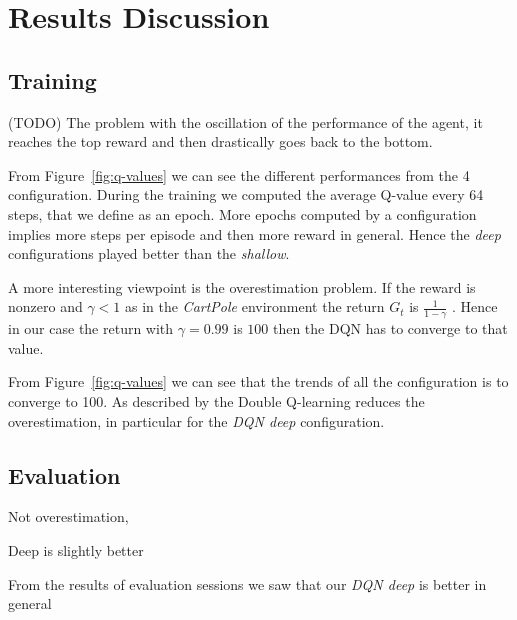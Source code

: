 \section{Results Discussion}

\subsection{Training}

(TODO) The problem with the oscillation of the performance of the agent, it reaches the top reward and then drastically goes back to the bottom.

%

From Figure~\ref{fig:q-values} we can see the different performances from the 4 configuration. During the training we computed the average Q-value every 64 steps, that we define as an epoch. More epochs computed by a configuration implies more steps per episode and then more reward in general. Hence the \textit{deep} configurations played better than the \textit{shallow}.


A more interesting viewpoint is the overestimation problem. If the reward is nonzero and $\gamma < 1$ as in the \textit{CartPole} environment the return $G_t$ is $\frac{1}{1 - \gamma}$ \cite{Sutton:1998:IRL:551283}. Hence in our case the return with $\gamma = 0.99$ is $100$ then the DQN has to converge to that value.

From Figure~\ref{fig:q-values} we can see that the trends of all the configuration is to converge to 100. As described by \citeauthor{Hasselt:2016:DRL:3016100.3016191}  the Double Q-learning reduces the overestimation, in particular for the \textit{DQN deep} configuration.



\subsection{Evaluation}


Not overestimation, 




Deep is slightly better

% 

From the results of evaluation sessions we saw that our \textit{DQN deep} is better in general


